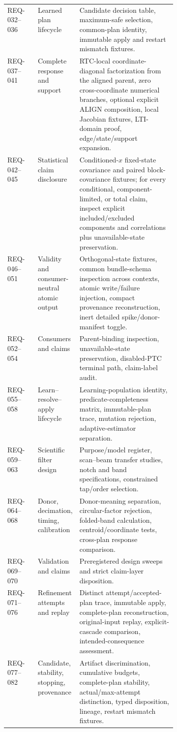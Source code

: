 \documentclass[10pt]{article}
\begin{document}
\begin{tabularx}{\linewidth}{@{}p{0.18\linewidth}p{0.22\linewidth}X@{}}
REQ-032--036 & Learned plan lifecycle & Candidate decision table, maximum-safe selection, common-plan identity, immutable apply and restart mismatch fixtures. \\
REQ-037--041 & Complete response and support & RTC-local coordinate-diagonal factorization from the aligned parent, zero cross-coordinate numerical branches, optional explicit ALIGN composition, local Jacobian fixtures, LTI-domain proof, edge/state/support expansion. \\
REQ-042--045 & Statistical claim disclosure & Conditioned-$x$ fixed-state covariance and paired block-covariance fixtures; for every conditional, component-limited, or total claim, inspect explicit included/excluded components and correlations plus unavailable-state preservation. \\
REQ-046--051 & Validity and consumer-neutral atomic output & Orthogonal-state fixtures, common bundle-schema inspection across contexts, atomic write/failure injection, compact provenance reconstruction, inert detailed spike/donor-manifest toggle. \\
REQ-052--054 & Consumers and claims & Parent-binding inspection, unavailable-state preservation, disabled-PTC terminal path, claim-label audit. \\
REQ-055--058 & Learn--resolve--apply lifecycle & Learning-population identity, predicate-completeness matrix, immutable-plan trace, mutation rejection, adaptive-estimator separation. \\
REQ-059--063 & Scientific filter design & Purpose/model register, scan--beam transfer studies, notch and band specifications, constrained tap/order selection. \\
REQ-064--068 & Donor, decimation, timing, calibration & Donor-meaning separation, circular-factor rejection, folded-band calculation, centroid/coordinate tests, cross-plan response comparison. \\
REQ-069--070 & Validation and claims & Preregistered design sweeps and strict claim-layer disposition. \\
REQ-071--076 & Refinement attempts and replay & Distinct attempt/accepted-plan trace, immutable apply, complete-plan reconstruction, original-input replay, explicit-cascade comparison, intended-consequence assessment. \\
REQ-077--082 & Candidate, stability, stopping, provenance & Artifact discrimination, cumulative budgets, complete-plan stability, actual/max-attempt distinction, typed disposition, lineage, restart mismatch fixtures. \\

\end{tabularx}
\end{document}
